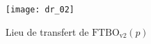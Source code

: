 \begin{figure}[H]
\centering
\texttt{[image: dr\_02]}

\caption{Lieu de transfert de $\text{FTBO}_{\text{v2}}(p)$ \label{dr_02}}
\end{figure}

%
%
%
%
%
%
